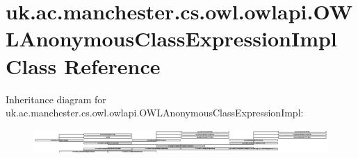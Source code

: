 \hypertarget{classuk_1_1ac_1_1manchester_1_1cs_1_1owl_1_1owlapi_1_1_o_w_l_anonymous_class_expression_impl}{\section{uk.\-ac.\-manchester.\-cs.\-owl.\-owlapi.\-O\-W\-L\-Anonymous\-Class\-Expression\-Impl Class Reference}
\label{classuk_1_1ac_1_1manchester_1_1cs_1_1owl_1_1owlapi_1_1_o_w_l_anonymous_class_expression_impl}
}
Inheritance diagram for uk.\-ac.\-manchester.\-cs.\-owl.\-owlapi.\-O\-W\-L\-Anonymous\-Class\-Expression\-Impl\-:\begin{figure}[H]
\begin{center}
\leavevmode
\includegraphics[height=0.949958cm]{classuk_1_1ac_1_1manchester_1_1cs_1_1owl_1_1owlapi_1_1_o_w_l_anonymous_class_expression_impl}
\end{center}
\end{figure}
